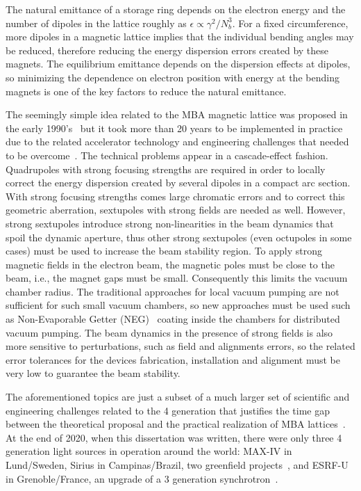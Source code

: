 The natural emittance of a storage ring depends on the electron energy and the number of dipoles in the lattice roughly as $\epsilon \propto \gamma^2/N_{b}^3$. For a fixed circumference, more dipoles in a magnetic lattice implies that the individual bending angles may be reduced, therefore reducing the energy dispersion errors created by these magnets. The equilibrium emittance depends on the dispersion effects at dipoles, so minimizing the dependence on electron position with energy at the bending magnets is one of the key factors to reduce the natural emittance.

The seemingly simple idea related to the MBA magnetic lattice was proposed in the early 1990's~\cite{einfeld1993} but it took more than 20 years to be implemented in practice due to the related accelerator technology and engineering challenges that needed to be overcome~\cite{hettel}. The technical problems appear in a cascade-effect fashion. Quadrupoles with strong focusing strengths are required in order to locally correct the energy dispersion created by several dipoles in a compact arc section. With strong focusing strengths comes large chromatic errors and to correct this geometric aberration, sextupoles with strong fields are needed as well. However, strong sextupoles introduce strong non-linearities in the beam dynamics that spoil the dynamic aperture, thus other strong sextupoles (even octupoles in some cases) must be used to increase the beam stability region. To apply strong magnetic fields in the electron beam, the magnetic poles must be close to the beam, i.e., the magnet gaps must be small. Consequently this limits the vacuum chamber radius. The traditional approaches for local vacuum pumping are not sufficient for such small vacuum chambers, so new approaches must be used such as Non-Evaporable Getter (NEG)~\cite{benvenuti} coating inside the chambers for distributed vacuum pumping. The beam dynamics in the presence of strong fields is also more sensitive to perturbations, such as field and alignments errors, so the related error tolerances for the devices fabrication, installation and alignment must be very low to guarantee the beam stability. 

The aforementioned topics are just a subset of a much larger set of scientific and engineering challenges related to the 4 generation that justifies the time gap between the theoretical proposal and the practical realization of MBA lattices~\cite{hettel, neuenschwander}. At the end of 2020, when this dissertation was written, there were only three 4 generation light sources in operation around the world: MAX-IV in Lund/Sweden, Sirius in Campinas/Brazil, two greenfield projects~\cite{tavaresmaxiv, liu2014}, and ESRF-U in Grenoble/France, an upgrade of a 3 generation synchrotron~\cite{raimondi}.
